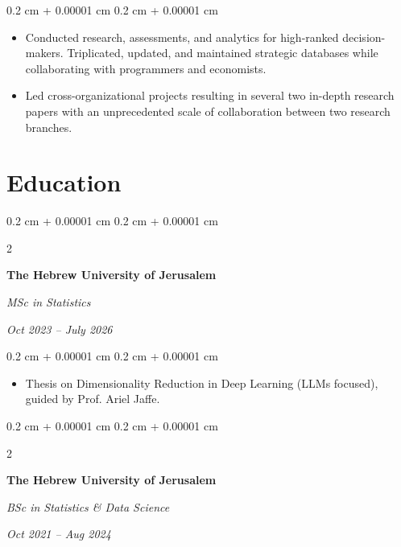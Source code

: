 \documentclass[10pt, letterpaper]{article}
\newenvironment{highlights}{
    \begin{itemize}[
        topsep=0.10 cm,
        parsep=0.10 cm,
        partopsep=0pt,
        itemsep=0pt,
        leftmargin=0.4 cm + 10pt
    ]
}{
    \end{itemize}
} %
\newenvironment{onecolentry}{
    \begin{adjustwidth}{
        0.2 cm + 0.00001 cm
    }{
        0.2 cm + 0.00001 cm
    }
}{
    \end{adjustwidth}
} %
\newenvironment{twocolentry}[2][]{
    \onecolentry
    \def\secondColumn{#2}
    \setcolumnwidth{\fill, 4.5 cm}
    \begin{paracol}{2}
}{
    \switchcolumn \raggedleft \secondColumn
    \end{paracol}
    \endonecolentry
} %
\begin{document}
        \vspace{0.10 cm}
        \begin{onecolentry}
            \begin{highlights}
                \item Conducted research, assessments, and analytics for high-ranked decision-makers. Triplicated, updated, and maintained strategic databases while collaborating with programmers and economists.
                \item Led cross-organizational projects resulting in several two in-depth research papers with an unprecedented scale of collaboration between two research branches.
            \end{highlights}
        \end{onecolentry}



    
    \section{Education}



        
        \begin{twocolentry}{
            
            
        \textit{Oct 2023 – July 2026}}
            \textbf{The Hebrew University of Jerusalem}

            \textit{MSc in Statistics}
        \end{twocolentry}

        \vspace{0.10 cm}
        \begin{onecolentry}
            \begin{highlights}
                \item Thesis on Dimensionality Reduction in Deep Learning (LLMs focused), guided by Prof. Ariel Jaffe.
            \end{highlights}
        \end{onecolentry}


        \vspace{0.2 cm}

        \begin{twocolentry}{
            
            
        \textit{Oct 2021 – Aug 2024}}
            \textbf{The Hebrew University of Jerusalem}

            \textit{BSc in Statistics \& Data Science}
        \end{twocolentry}
\end{document}

